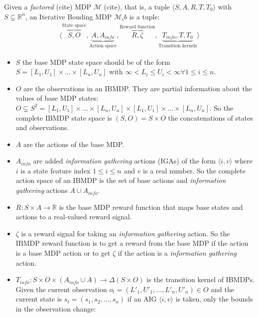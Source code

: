 \begin{definition}
Given a \textit{factored} (cite) MDP $\mathcal{M}$ (cite), that is, a tuple $\langle S, A, R, T, T_0 \rangle$ with $S\subsetneq \mathbb{R}^n$, an Iterative Bouding MDP $\mathcal{M}_ib$ is a tuple:
\begin{align*}
    \langle \overbrace{S, O}^{\text{State space}}, \underbrace{A, A_{info}}_{\text{Action space}}, \overbrace{R, \zeta}^{\text{Reward function}}, \underbrace{T_{info}, T, T_0}_{\text{Transition kernels}}\rangle
\end{align*}

\begin{itemize}
\item $S$ the base MDP state space should be of the form $S = [L_1, U_1]\times \dots \times [L_n, U_n]$ with $\infty < L_i \leq U_i < \infty \forall 1\leq i\leq n$.
\item $O$ are the observations in an IBMDP. They are partial information about the values of base MDP states: $O\subsetneq S^2 =  [L_1, U_1]\times \dots \times [L_n, U_n] \times [L_1, U_1]\times \dots \times [L_n, U_n]$. So the complete IBMDP state space is $(S, O) = S \times O$ the concatenations of states and observations.
\item $A$ are the actions of the base MDP.
\item $A_{info}$ are added \textit{information gathering} actions (IGAs) of the form $\langle i, v \rangle$ where $i$ is a state feature index $1 \leq i \leq n$ and $v$ is a real number. So the complete action space of an IBMDP is the set of base actions and \textit{information gathering} actions $A \cup A_{info}$.
\item $R: S\times A \rightarrow \mathbb{R}$ is the base MDP reward function that maps base states and actions to a real-valued reward signal.
\item $\zeta$ is a reward signal for taking an \textit{information gathering} action. So the IBMDP reward function is to get a reward from the base MDP if the action is a base MDP action or to get $\zeta$ if the action is a \textit{information gathering} action.
\item $T_{info}: S\times O \times( A_{info} \cup A )\rightarrow \Delta (S\times O)$ is the transition kernel of IBMDPs. 
Given the current observation $o_{t} = (L'_1, U'_1, \dots, L'_n, U'_n)\in O$ and the current state is $s_t=(s_1, s_2, \dots, s_n)$ if an AIG $\langle i, v \rangle$ is taken, only the bounds in the observation change:
\begin{align*}

\end{align*}
\end{itemize}
\end{definition}
